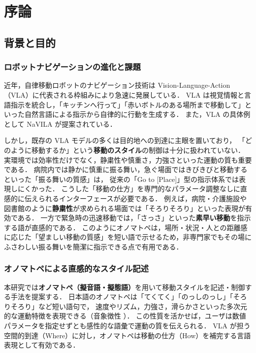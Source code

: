 \chapter{序論}
\label{chap:序論}

\section{背景と目的}
\label{sec:背景と目的}

\subsection{ロボットナビゲーションの進化と課題}
近年，自律移動ロボットのナビゲーション技術は Vision-Language-Action（VLA）に代表される枠組みにより急速に発展している．
VLA は視覚情報と言語指示を統合し，「キッチンへ行って」「赤いボトルのある場所まで移動して」といった自然言語による指示から自律的に行動を生成する．
また，VLA の具体例として NaVILA \cite{NaVILA_paper} が提案されている．

しかし，既存の VLA モデルの多くは目的地への到達に主眼を置いており，
「どのように移動するか」という\textbf{移動のスタイル}の制御は十分に扱われていない．
実環境では効率性だけでなく，静粛性や慎重さ，力強さといった運動の質も重要である．
病院内では静かに慎重に振る舞い，急ぐ場面ではきびきびと移動するといった「振る舞いの質感」は，
従来の「Go to [Place]」型の指示体系では表現しにくかった．
こうした「移動の仕方」を専門的なパラメータ調整なしに直感的に伝えられるインターフェースが必要である．
例えば，病院・介護施設や図書館のように\textbf{静粛性}が求められる場面では「そろりそろり」といった表現が有効である．
一方で緊急時の迅速移動では，「さっさ」といった\textbf{素早い移動}を指示する語が直感的である．
このようにオノマトペは，場所・状況・人との距離感に応じた「望ましい移動の質感」を短い語で示せるため，非専門家でもその場にふさわしい振る舞いを簡潔に指示できる点で有用である．

\subsection{オノマトペによる直感的なスタイル記述}
本研究では\textbf{オノマトペ（擬音語・擬態語）}を用いて移動スタイルを記述・制御する手法を提案する．
日本語のオノマトペは「てくてく」「のっしのっし」「そろりそろり」など短い語句で，
速度やリズム，力強さ，滑らかさといった多次元的な運動特徴を表現できる（音象徴性 \cite{hoyo}）．
この性質を活かせば，ユーザは数値パラメータを指定せずとも感性的な語彙で運動の質を伝えられる．
VLA が担う空間的到達（Where）に対し，オノマトペは移動の仕方（How）を補完する言語表現として有効である．

